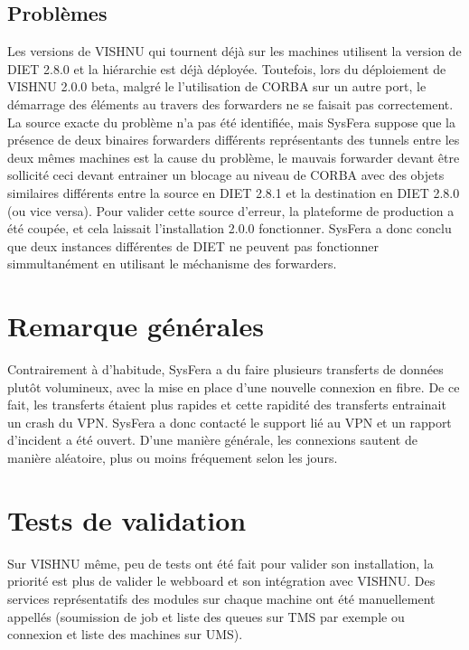 \documentclass{article}
\begin{document}
\subsection{Probl\`emes}
Les versions de VISHNU qui tournent d\'ej\`a sur les machines utilisent
la version de DIET 2.8.0 et la hi\'erarchie est d\'ej\`a d\'eploy\'ee.
Toutefois, lors du d\'eploiement de VISHNU 2.0.0 beta, malgré le 
l'utilisation de CORBA sur un autre port, le démarrage des 
\'el\'ements au travers des forwarders ne se faisait pas correctement.
La source exacte du probl\`eme n'a pas \'et\'e identifi\'ee, mais 
SysFera suppose que la pr\'esence de deux binaires forwarders diff\'erents
repr\'esentants des tunnels entre les deux m\^emes machines est la
cause du probl\`eme, le mauvais forwarder devant \^etre sollicit\'e 
ceci devant entrainer un blocage au niveau de CORBA avec des objets 
similaires diff\'erents entre la source en DIET 2.8.1 et la destination
en DIET 2.8.0 (ou vice versa). 
Pour valider cette source d'erreur, la plateforme de production a 
\'et\'e coup\'ee, et cela laissait l'installation 2.0.0 fonctionner.
SysFera a donc conclu que deux instances diff\'erentes de DIET ne peuvent 
pas fonctionner simmultan\'ement en utilisant le m\'echanisme des
forwarders.

\section{Remarque g\'en\'erales}
Contrairement \`a d'habitude, SysFera a du faire plusieurs 
transferts de donn\'ees plut\^ot volumineux, avec la mise en
place d'une nouvelle connexion en fibre. De ce fait, les 
transferts \'etaient plus rapides et cette rapidit\'e des 
transferts entrainait un crash du VPN. SysFera a donc
contact\'e le support li\'e au VPN et un rapport d'incident 
a \'et\'e ouvert. D'une mani\`ere g\'en\'erale, les connexions sautent
de mani\`ere al\'eatoire, plus ou moins fr\'equement selon les jours.

\section{Tests de validation}
Sur VISHNU m\^eme, peu de tests ont \'et\'e fait pour valider 
son installation, la priorit\'e est plus de valider le webboard
et son int\'egration avec VISHNU. Des services repr\'esentatifs des modules 
sur chaque machine ont \'et\'e manuellement appell\'es 
(soumission de job et liste des queues sur TMS par exemple ou 
connexion et liste des machines sur UMS).
%
%
    
\end{document}
